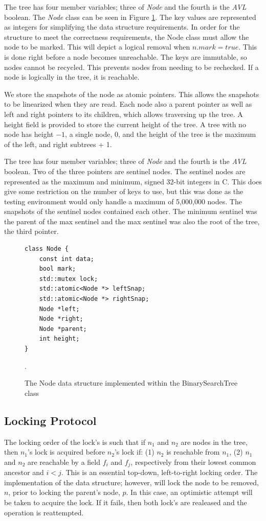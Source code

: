 \documentclass[conference]{IEEEtran}
\theoremstyle{definition}
\theoremstyle{theorem}
\begin{document}
The tree has four member variables; three of \textit{Node} and the fourth is the \textit{AVL} boolean. The \textit{Node} class can be seen in Figure \ref{fig:node}. The key values are represented as integers for simplifying the data structure requirements. In order for the structure to meet the correctness requirements, the Node class must allow the node to be marked. This will depict a logical removal when $n.mark = true$. This is done right before a node becomes unreachable. The keys are immutable, so nodes cannot be recycled. This prevents nodes from needing to be rechecked. If a node is logically in the tree, it is reachable. 

We store the snapshots of the node as atomic pointers. This allows the snapshots to be linearized when they are read. Each node also a parent pointer as well as left and right pointers to its children, which allows traversing up the tree. A height field is provided to store the current height of the tree. A tree with no node has height $-1$, a single node, 0, and the height of the tree is the maximum of the left, and right subtrees + 1.

The tree has four member variables; three of \textit{Node} and the fourth is the \textit{AVL} boolean. Two of the three pointers are sentinel nodes. The sentinel nodes are represented as the maximum and minimum, signed 32-bit integers in C. This does give some restriction on the number of keys to use, but this was done as the testing environment would only handle a maximum of 5,000,000 nodes. The snapshots of the sentinel nodes contained each other. The minimum sentinel was the parent of the max sentinel and the max sentinel was also the root of the tree, the third pointer.
\begin{figure}[t]
\label{fig:node}
\centering
\begin{lstlisting}
class Node {
	const int data;
	bool mark;
	std::mutex lock;
	std::atomic<Node *> leftSnap;
	std::atomic<Node *> rightSnap;
	Node *left;
	Node *right;
	Node *parent;
	int height;
}
\end{lstlisting}
\caption{The Node data structure implemented within the BinarySearchTree class}.
\end{figure}

\subsection{Locking Protocol}
The locking order of the lock's is such that if $n_1$ and $n_2$ are nodes in the tree, then $n_1$'s lock is acquired before $n_2$'s lock if: (1) $n_2$ is reachable from $n_1$, (2) $n_1$ and $n_2$ are reachable by a field $f_i$ and $f_j$, respectively from their lowest common ancestor and $i<j$. This is an essential top-down, left-to-right locking order. The implementation of the data structure; however, will lock the node to be removed, $n$, prior to locking the parent's node, $p$. In this case, an optimistic attempt will be taken to acquire the lock. If it fails, then both lock's are realeased and the operation is reattempted.
\end{document}
